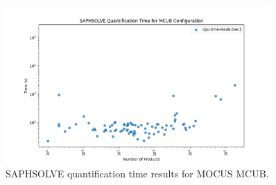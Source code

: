\begin{figure}[H]
    \centering
    \includegraphics[width=0.9\textwidth]{3_identifying_gaps/benchmarking/profiling_methods/figures/saphsolve_quant_time.png}
    \caption{SAPHSOLVE quantification time results for MOCUS MCUB.}
    \label{fig:saphsolve_quant_time}
\end{figure}
